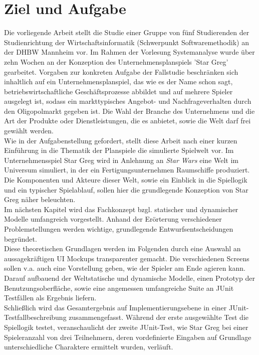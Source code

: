 \section{Ziel und Aufgabe}
\label{sec:einleitung-ziel}

Die vorliegende Arbeit stellt die Studie einer Gruppe von fünf Studierenden der Studienrichtung der Wirtschaftsinformatik (Schwerpunkt Softwaremethodik) an der DHBW Mannheim vor. Im Rahmen der Vorlesung Systemanalyse wurde über zehn Wochen an der Konzeption des Unternehmensplanspiels 'Star Greg' gearbeitet. Vorgaben zur konkreten Aufgabe der Fallstudie beschränken sich inhaltlich auf ein Unternehmensplanspiel, das wie es der Name schon sagt, betriebswirtschaftliche Geschäftsprozesse abbildet und auf mehrere Spieler ausgelegt ist, sodass ein markttypisches Angebot- und Nachfrageverhalten durch den Oligopolmarkt gegeben ist. Die Wahl der Branche des Unternehmens und die Art der Produkte oder Dienstleistungen, die es anbietet, sowie die Welt darf frei gewählt werden. 
\\
Wie in der Aufgabenstellung gefordert, stellt diese Arbeit nach einer kurzen Einführung in die Thematik der Planspiele die simulierte Spielwelt vor. Im Unternehmensspiel Star Greg wird in Anlehnung an \textit{Star Wars} eine Welt im Universum simuliert, in der ein Fertigungsunternehmen Raumschiffe produziert. Die Komponenten und Akteure dieser Welt, sowie ein Einblick in die Spiellogik und ein typischer Spielablauf, sollen hier die grundlegende Konzeption von Star Greg näher beleuchten.  
\\
Im nächsten Kapitel wird das Fachkonzept bzgl. statischer und dynamischer Modelle umfangreich vorgestellt. Anhand der Erörterung verschiedener Problemstellungen werden wichtige, grundlegende Entwurfsentscheidungen begründet.
\\
Diese theoretischen Grundlagen werden im Folgenden durch eine Auswahl an aussagekräftigen UI Mockups transparenter gemacht. Die verschiedenen Screens sollen v.a. auch eine Vorstellung geben, wie der Spieler am Ende agieren kann. 
\\
Darauf aufbauend  der Weltstatische und dynamische Modelle, einen Prototyp der Benutzungsoberfläche, sowie eine angemessen umfangreiche Suite an JUnit Testfällen als Ergebnis liefern. 
\\
Schließlich wird das Gesamtergebnis auf Implementierungsebene in einer  JUnit-Testfallbeschreibung zusammengefasst. Während der erste ausgewählte Test die Spiellogik testet, veranschaulicht der zweite JUnit-Test, wie Star Greg bei einer Spieleranzahl von drei Teilnehmern, deren vordefinierte Eingaben auf Grundlage unterschiedliche Charaktere ermittelt wurden, verläuft. 


